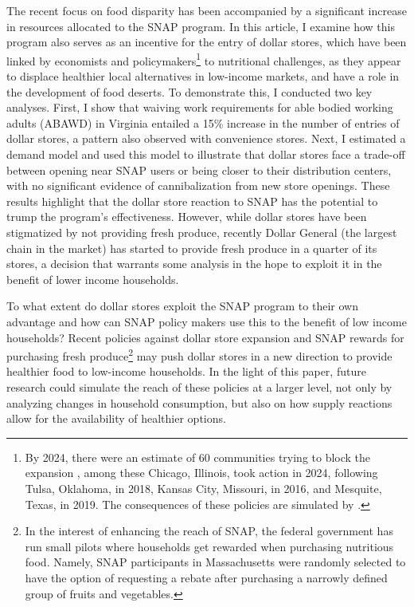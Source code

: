 \documentclass[11.5pt]{article}
\begin{document}
The recent focus on food disparity has been accompanied by a significant increase in resources allocated to the SNAP program. In this article, I examine how this program also serves as an incentive for the entry of dollar stores, which have been linked by economists and policymakers\footnote{By 2024, there were an estimate of 60 communities trying to block the expansion \cite{businessinsider2024dollarstores}, among these Chicago, Illinois, took action in 2024, following Tulsa, Oklahoma, in 2018, Kansas City, Missouri, in 2016, and Mesquite, Texas, in 2019. The consequences of these policies are simulated by \citeauthor{caoui2022impact} \citeyear{caoui2022impact}.} to nutritional challenges, as they appear to displace healthier local alternatives in low-income markets, and have a role in the development of food deserts.  To demonstrate this, I conducted two key analyses.  First, I show that waiving work requirements for able bodied working adults (ABAWD) in Virginia entailed a 15\% increase in the number of entries of dollar stores, a pattern also observed with convenience stores. Next, I estimated a demand model and used this model to illustrate that dollar stores face a trade-off between opening near SNAP users or being closer to their distribution centers, with no significant evidence of cannibalization from new store openings. These results highlight that the dollar store reaction to SNAP has the potential to trump the program's effectiveness. However, while dollar stores have been stigmatized by not providing fresh produce, recently Dollar General (the largest chain in the market) has started to provide fresh produce in a quarter of its stores, a decision that warrants some analysis in the hope to exploit it in the benefit of lower income households. 

To what extent do dollar stores exploit the SNAP program to their own advantage and how can SNAP policy makers use this to the benefit of low income households? Recent policies against dollar store expansion and SNAP rewards for purchasing fresh produce\footnote{In the interest of enhancing the reach of SNAP, the federal government has run small pilots where households get rewarded when purchasing nutritious food. Namely, SNAP  participants in Massachusetts were randomly selected to have the option of requesting a rebate after purchasing a narrowly defined group of fruits and vegetables.} may push dollar stores in a new direction to provide healthier food to low-income households. In the light of this paper, future research could simulate the reach of these policies at a larger level, not only by analyzing changes in household consumption, but also on how supply reactions allow for the availability of healthier options. 
\end{document}
